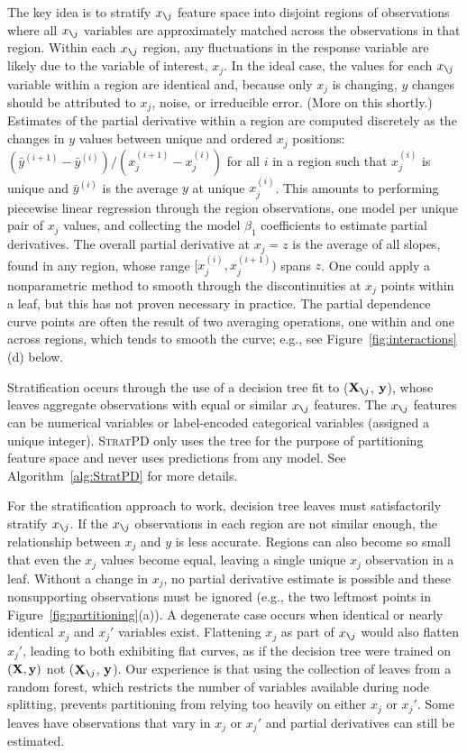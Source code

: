 \documentclass[]{article} %
\newcommand{\figref}[1]{Figure~\ref{#1}}
\newcommand{\algref}[1]{Algorithm~\ref{#1}}
\newcommand{\spd}{\fontfamily{cmr}\textsc{\small StratPD}}
\newcommand{\Xnj}{${\bf X}_{\texttt{\char`\\} j}$}
\newcommand{\xnj}{$x_{\texttt{\char`\\} j}$}
\begin{document}
The key idea is to stratify \xnj{} feature space into disjoint regions of observations where all \xnj{} variables are approximately matched across the observations in that region. Within each \xnj{} region, any fluctuations in the response variable are likely due to the variable of interest, $x_j$.  In the ideal case, the values for each \xnj{} variable within a region are identical and, because only $x_j$ is changing, $y$ changes should be attributed to $x_j$, noise, or irreducible error. (More on this shortly.) Estimates of the partial derivative within a region are computed discretely as the changes in $y$ values between unique and ordered $x_j$ positions:  $(\bar{y}^{(i+1)} - \bar{y}^{(i)})/(x_j^{(i+1)} - x_j^{(i)})$ for all $i$ in a region such that $x_j^{(i)}$ is unique and $\bar{y}^{(i)}$ is the average $y$ at unique $x_j^{(i)}$.  This amounts to performing piecewise linear regression through the region observations, one model per unique pair of $x_j$ values, and collecting the model $\beta_1$ coefficients to estimate partial derivatives. The overall partial derivative at $x_j=z$ is the average of all slopes, found in any region, whose range $[x_j^{(i)},x_j^{(i+1)})$ spans $z$.  One could apply a nonparametric method to smooth through the discontinuities at $x_j$ points within a leaf, but this has not proven necessary in practice.  The partial dependence curve points are often the result of two averaging operations, one within and one across regions, which tends to smooth the curve; e.g., see \figref{fig:interactions}(d) below. 

Stratification occurs through the use of a decision tree fit to (\Xnj, $\bf y$), whose leaves aggregate observations with equal or similar \xnj{} features. The \xnj{} features can be numerical variables or label-encoded categorical variables (assigned a unique integer). \spd{} only uses the tree for the purpose of partitioning feature space and never uses predictions from any model. See \algref{alg:StratPD} for more details.

For the stratification approach to work, decision tree leaves must satisfactorily stratify \xnj{}. If the \xnj{} observations in each region are not similar enough, the relationship between $x_j$ and $y$   is less accurate.  Regions can also become so small that even the $x_j$ values become equal, leaving a single unique $x_j$ observation in a leaf. Without a change in $x_j$, no partial derivative estimate is possible and these nonsupporting observations must be  ignored (e.g., the two leftmost points in \figref{fig:partitioning}(a)). A degenerate case occurs when identical or nearly identical $x_j$ and $x_j'$ variables exist. Flattening $x_j$ as part of \xnj{} would also flatten $x_j'$, leading to both exhibiting flat curves, as if the decision tree were trained on $(\bf X, y)$ not (\Xnj, $\bf y$). Our experience is that using the collection of leaves from a random forest, which restricts the number of variables available during node splitting, prevents partitioning from relying too heavily on either $x_j$ or $x_j'$. Some leaves have observations that vary in $x_j$ or $x_j'$ and partial derivatives can still be estimated.
\end{document}
